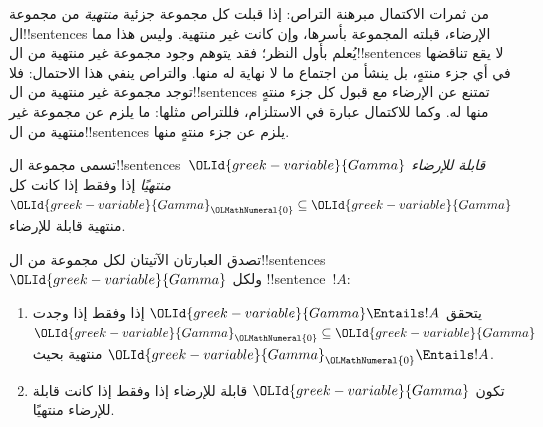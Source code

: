 \documentclass[../../../include/open-logic-section]{subfiles}
\begin{document}
      {}
      {}


من ثمرات الاكتمال مبرهنة التراص: إذا قبلت كل مجموعة جزئية
\emph{منتهية} من مجموعة ال!!{sentence}s الإرضاء، قبلته المجموعة
بأسرها، وإن كانت غير منتهية. وليس هذا مما يُعلم بأول النظر؛ فقد يتوهم
وجود مجموعة غير منتهية من ال!!{sentence}s لا يقع تناقضها في أي جزء
منتهٍ، بل ينشأ من اجتماع ما لا نهاية له منها. والتراص ينفي هذا
الاحتمال: فلا توجد مجموعة غير منتهية من ال!!{sentence}s تمتنع عن
الإرضاء مع قبول كل جزء منتهٍ منها له. وكما للاكتمال عبارة في
الاستلزام، فللتراص مثلها: ما يلزم عن مجموعة غير منتهية من
ال!!{sentence}s يلزم عن جزء منتهٍ منها.

\begin{defn}
  تسمى مجموعة ال!!{sentence}s~$\OLId{greek-variable}{Gamma}$ \emph{قابلة للإرضاء منتهيًا} إذا
  وفقط إذا كانت كل $\OLId{greek-variable}{Gamma}_\OLMathNumeral{0} \subseteq \OLId{greek-variable}{Gamma}$ منتهية قابلة للإرضاء.
\end{defn}

\begin{thm}
تصدق العبارتان الآتيتان لكل مجموعة من ال!!{sentence}s~$\OLId{greek-variable}{Gamma}$ ولكل
!!{sentence}~$!A$:
\begin{enumerate}
  \item يتحقق $\OLId{greek-variable}{Gamma} \Entails !A$ إذا وفقط إذا وجدت
    $\OLId{greek-variable}{Gamma}_\OLMathNumeral{0} \subseteq \OLId{greek-variable}{Gamma}$ منتهية بحيث $\OLId{greek-variable}{Gamma}_\OLMathNumeral{0} \Entails !A$.
  \item تكون $\OLId{greek-variable}{Gamma}$ قابلة للإرضاء إذا وفقط إذا كانت قابلة للإرضاء
    منتهيًا.
\end{enumerate}
\end{thm}
\end{document}
